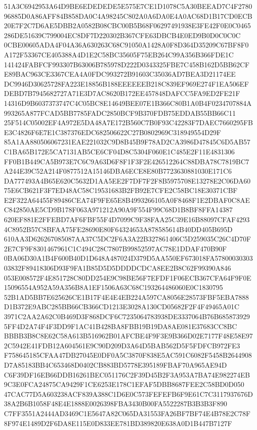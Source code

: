 \documentclass[UTF8,fontset=fandol,zihao=-4,a4paper]{ctexart}
\begin{document}
{{51A3C6942953A64D9BE6EDEDEDE5E575E7CE1D1078C5A30BEEAD7C4F278096885D0A86AFF84B858DA0C4A98245C802A0A6DA0E4A0AC68D1B17CD0ECB
20E7F2C7D6AE5DBB2A0582B08CBC00B5B68F06297491938E3FE42F0E0C0465286DE51639C799004EC8DF7D220302B367CFE63DBCB4E0ED9B0D0C0C0C
0CBE00605ADA4F04A36A630263C68C91050A1428A0F8D364D35209C67BF8F0A172F53367CE405388A4D1E2C58BC35605F75EB264C99A356B366FDE1C
141424FABFCF993307B63006B785978D222D0343325FBE7C458B162D5BB62CFE89BAC963CE3367CEA4A0FDC993272B91603C35036AD7BEA3D21174EE
DC9946D30625728FA223E18856B188EEEEEEB218C839EF969E274F1EA506EFDEBD7B7945682727A71E3D7AC8620B172EE457848DAFCC5FA9ED2FE21F
14316D9B6037373747C4C05BC8E14649BEE07E1B366C80B1A0B4F0234707884A993265A877FCAD5BB7785FADC2850BCF9B370FDB75EDDAB55BB66C11
25F514C05002EF4A972E5DA48A7E172B560C7B0F93C42283F7DAEC7660295FBE3C4826F6E7E1C387376EDC682506622C27B0802969C318949554D29F
85A1AA880506067231EAE221032C9D8B45B9F78AD2CA3986D47845C6D5AB57C1BA65B172E5CA7131AB5CE6CF04D8C5304F060E1C485E2F11E4831306
FF0B1B449CA5B973E7C6C9A63D6F8F1F3F2E426512264C88DBA78C7819BC7A244E39C52A214F0877512A15146DBA6ECE8E80B7723630881030E171C6
DA777493A4B65E620C5632D1AA5EE2F7DF7F2F8B5975708E13278E2C06DA6075E6CB621F3F7ED48AC58C19531683B2FB92E7CFE2C58BC18E30371CBF
E2F322A64455F89486CEA74F9FE65E8B4993266105A0F8468F1E2DBAF0C8AEC842850AE5CD9B178F063A971212A90A9F554F99C68D1B8BF8FFA14387
620EF881E2FFEBD7AF6FBF55F4D7099C9F38FAA25C39E16B88097CFAF42934C8952B57C8BFAA75FE28690E80F64324653A878585614B40DD405B695D
610AA3D626267085087AA37C5DC2F6A3A22B327861406C5D259035C26C4D70F2E7CF9F8301467961C1C494C28C7807B99852597AC78E1DDAF470B90F
0BA06D30A1B4F600B40D1D648A487024D379D5AA550EF673018FA5780003030303832F89418306D93F9FA1B85D5D5DDDDCDCA8EE2B8C62F99390A846
053E008572F4E851728C80DD254E9C98BE56F7EFDF1F06ECB367CFA64F9F0E15096554A952A59A356B8A1EF1506A63C68C193264486060E0C1830795
52B1AD5BB7E625626CE1B17F4E4E4EB224A597CA8056E28573FBF5EBA7888D1B372E9ABC285BB66CB366CD1213E3028A130CD05682F2F4F49465A01C
3971C2AA2A62C0B469D3F868DCF6C7235064783938DE3337064B76B6858739295FF4D2A74F4F3DD9F1AC41B428BA8FBB19B19DA8AE081E37683CC8BC
BBBB3B8C8E62C58A613B516962B01AFCBE4F9F3E9B366D02E7177F48E58E972C5942E41FDB12A604561E9C90D209D3A64D5BAB562D5F5FDFCB972FE3
F758645185CFAA47DB27045E0DF0A5C3870F838E5AC591C6082F5458B2644908D7A85183BB4C653468D0402CB883BD5778E395189FBAF70A965AE94D
C6F39DF16EB66DDB16261BEC051176C2F39D45B2F3A953A7BA74E982274EB9C3E0FCA24875CA9429F1CE6253E178C1EFAF5DBB8687FEE2C58BD0D050
47CAC77D5A603238ACF839A388C1D6E0C573FEFEFB6F9E61C7C3117937676D38A2B6B1058F48E4E1888E0026398FBA3430B00FA5522287B3B3B3F890
C7FF3551A2444AD3469C1E5647A82C065DA31553FA26BF7BF74E4B78E2C78F8F974E1489D2F6DA8E115E0D833EE781BD389820E638A0D1B447B7127F
}}
\end{document}
